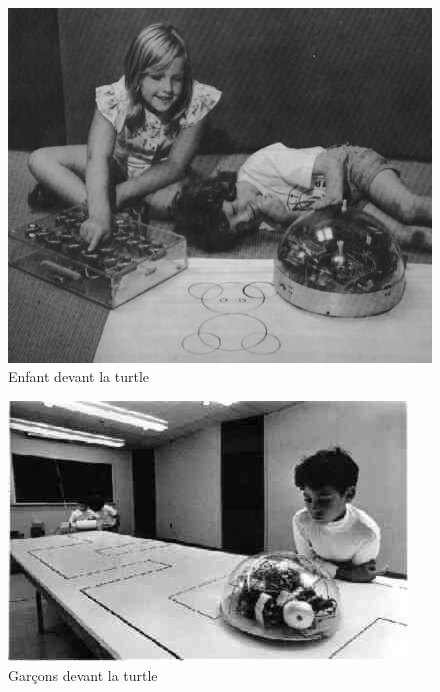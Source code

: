 \begin{minipage}[H]{0.5\linewidth}
  \begin{figure}[H]
  \centering
  \includegraphics[width=\textwidth]{../resources/illustrations/logo_turtle_2}
  \caption{Enfant devant la turtle}
  \end{figure}
\end{minipage}
\begin{minipage}[H]{0.5\linewidth}
  \begin{figure}[H]
  \centering
  \includegraphics[width=\textwidth]{../resources/illustrations/logo_turtle_3}
  \caption{Garçons devant la turtle}
  \end{figure}
\end{minipage}

